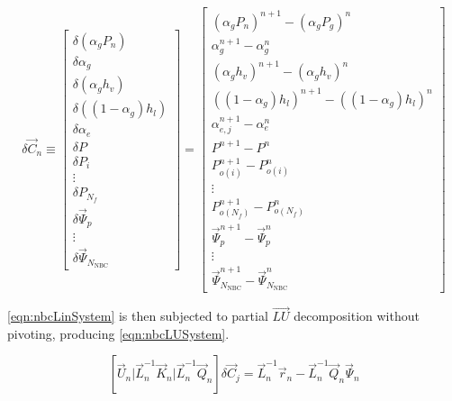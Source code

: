 \begin{equation}
\label{eqn:nbcUpdate}
\delta \vec{C}_{n} \equiv 
\begin{bmatrix}
\delta ( \alpha_{g} P_{n} ) \\
\delta \alpha_{g} \\
\delta ( \alpha_{g} h_v ) \\
\delta ( (1 - \alpha_{g} ) h_l ) \\
\delta \alpha_{e} \\
\delta P \\ 
\delta P_i \\
\vdots \\
\delta P_{N_{f}} \\
\delta \vec{\Psi}_{p} \\
\vdots \\
\delta \vec{\Psi}_{N_{\text{NBC}}}
\end{bmatrix}
=
\begin{bmatrix}
( \alpha_{g} P_{n})^{n+1} - (\alpha_{g} P_{g} )^{n} \\
\alpha^{n+1}_{g} - \alpha^{n}_{g} \\
( \alpha_{g} h_{v} )^{n+1} - ( \alpha_{g} h_{v} )^{n} \\
( ( 1 - \alpha_{g} ) h_{l} )^{n+1} - ( ( 1 - \alpha_{g} ) h_{l} )^{n} \\
\alpha^{n+1}_{e,j} - \alpha^{n}_{e} \\
 P^{n+1} - P^{n} \\
 P_{o(i)}^{n+1} - P_{o(i)}^{n} \\
 \vdots \\
 P_{o(N_{f})}^{n+1} - P_{o(N_{f})}^{n} \\
 \vec{\Psi}_{p}^{n+1} - \vec{\Psi}_{p}^{n} \\
 \vdots \\
 \vec{\Psi}_{N_{\text{NBC}}}^{n+1} - \vec{\Psi}_{N_{\text{NBC}}}^{n}
\end{bmatrix}
\end{equation}

\eqref{eqn:nbcLinSystem} is then subjected to partial $\vec{LU}$ decomposition without pivoting, producing \eqref{eqn:nbcLUSystem}.

\begin{equation}
\label{eqn:nbcLUSystem}
\left[ \vec{U}_{n} \vert \vec{L}^{-1}_{n}\vec{K}_{n} \vert \vec{L}^{-1}_{n}\vec{Q}_{n} \right] \delta \vec{C}_{j} = \vec{L}^{-1}_{n}\vec{r}_{n}  -\vec{L}^{-1}_{n}\vec{Q}_{n}\vec{\Psi}_{n}
\end{equation}

